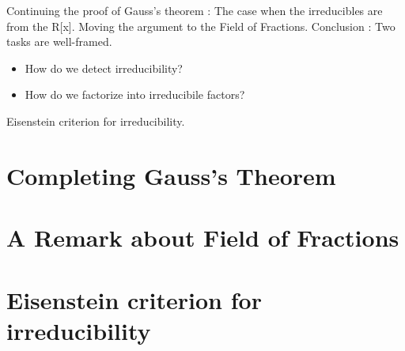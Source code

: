
\noindent
Continuing the proof of Gauss's theorem : The case when the irreducibles are from the R[x]. Moving the argument to the Field of Fractions.
Conclusion : Two tasks are well-framed.
\begin{itemize}
\item How do we detect irreducibility?
\item How do we factorize into irreducibile factors?
\end{itemize}

Eisenstein criterion for irreducibility. 

\section{Completing Gauss's Theorem}

\section{A Remark about Field of Fractions}

\section{Eisenstein criterion for irreducibility}